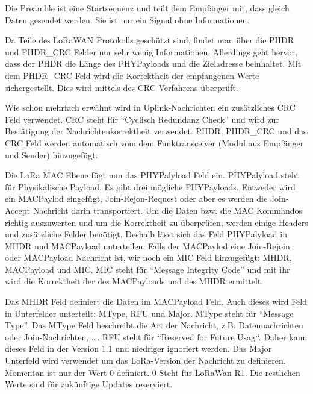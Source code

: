 \documentclass[a4paper,12pt]{article}
\begin{document}
                Die Preamble ist eine Startsequenz und teilt dem Empfänger mit, dass gleich Daten gesendet werden. 
                Sie ist nur ein Signal ohne Informationen.

                Da Teile des LoRaWAN Protokolls geschützt sind, findet man über die PHDR und PHDR\_CRC Felder nur sehr wenig 
                Informationen. Allerdings geht hervor, dass der PHDR die Länge des PHYPayloads und die Zieladresse 
                beinhaltet.
                Mit dem PHDR\_CRC Feld wird die Korrektheit der empfangenen Werte sichergestellt. Dies wird  
                mittels des CRC Verfahrens überprüft.
                
                Wie schon mehrfach erwähnt wird in Uplink-Nachrichten ein zusätzliches CRC Feld verwendet. CRC steht für 
                ``Cyclisch Redundanz Check'' und wird zur Bestätigung der Nachrichtenkorrektheit verwendet. 
                PHDR, PHDR\_CRC 
                und das CRC Feld werden automatisch vom dem Funktransceiver (Modul aus Empfänger und Sender) hinzugefügt.

                Die LoRa MAC Ebene fügt nun das PHYPalyload Feld ein. PHYPalyload steht für Physikalische Payload. 
                Es gibt drei mögliche PHYPayloads. Entweder wird ein MACPaylod eingefügt, Join-Rejon-Request oder aber 
                es werden die Join-Accept Nachricht darin transportiert. Um die Daten bzw. die MAC Kommandos richtig auszuwerten 
                und um die Korrektheit zu überprüfen, werden einige Headers und zusätzliche Felder benötigt. 
                Deshalb lässt sich das Feld PHYPalyload in MHDR und MACPayload unterteilen. Falls der 
                MACPaylod eine Join-Rejoin oder MACPayload Nachricht ist, wir noch ein MIC 
                Feld hinzugefügt: MHDR, MACPayload und MIC. MIC steht für ``Message Integrity Code'' und mit ihr wird 
                die Korrektheit der des MACPayloads und des MHDR ermittelt.

                Das MHDR Feld definiert die Daten im MACPayload Feld. Auch dieses wird Feld in 
                Unterfelder unterteilt: MType, RFU und Major. MType steht für ``Message Type''. Das MType Feld beschreibt die Art der 
                Nachricht, z.B. Datennachrichten oder Join-Nachrichten, \dots. 
                RFU steht für ``Reserved for Future Usag‘‘. Daher kann 
                dieses Feld in der Version 1.1 und niedriger ignoriert werden. Das Major Unterfeld wird verwendet um das 
                LoRa-Version der Nachricht zu definieren. Momentan ist nur der Wert 0 definiert. 0 Steht für LoRaWan R1. 
                Die restlichen Werte sind für zukünftige Updates reserviert.
\end{document}
